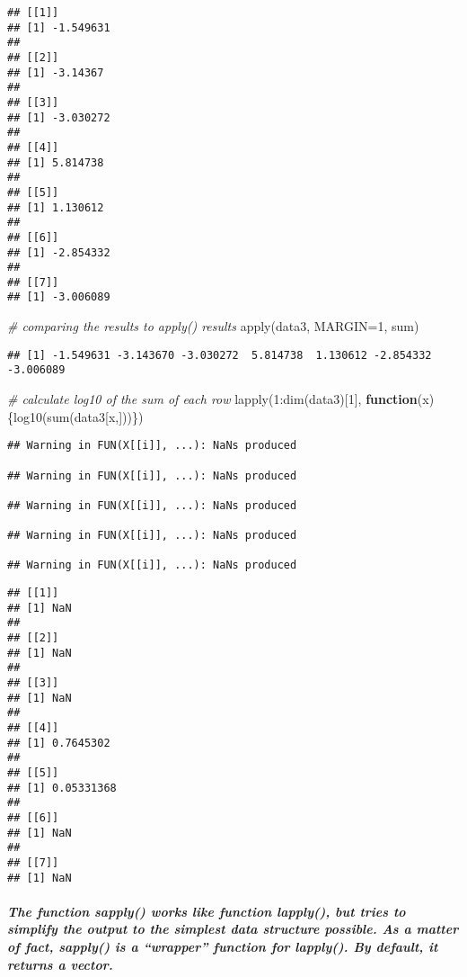 \documentclass[
]{article}
\newenvironment{Shaded}{\begin{snugshade}}{\end{snugshade}}
\newcommand{\AttributeTok}[1]{\textcolor[rgb]{0.77,0.63,0.00}{#1}}
\newcommand{\CommentTok}[1]{\textcolor[rgb]{0.56,0.35,0.01}{\textit{#1}}}
\newcommand{\ControlFlowTok}[1]{\textcolor[rgb]{0.13,0.29,0.53}{\textbf{#1}}}
\newcommand{\DecValTok}[1]{\textcolor[rgb]{0.00,0.00,0.81}{#1}}
\newcommand{\FunctionTok}[1]{\textcolor[rgb]{0.00,0.00,0.00}{#1}}
\newcommand{\NormalTok}[1]{#1}
\newcommand{\SpecialCharTok}[1]{\textcolor[rgb]{0.00,0.00,0.00}{#1}}
\begin{document}
\begin{verbatim}
## [[1]]
## [1] -1.549631
## 
## [[2]]
## [1] -3.14367
## 
## [[3]]
## [1] -3.030272
## 
## [[4]]
## [1] 5.814738
## 
## [[5]]
## [1] 1.130612
## 
## [[6]]
## [1] -2.854332
## 
## [[7]]
## [1] -3.006089
\end{verbatim}

\begin{Shaded}
\begin{Highlighting}[]
\CommentTok{\# comparing the results to apply() results}
\FunctionTok{apply}\NormalTok{(data3, }\AttributeTok{MARGIN=}\DecValTok{1}\NormalTok{, sum)}
\end{Highlighting}
\end{Shaded}

\begin{verbatim}
## [1] -1.549631 -3.143670 -3.030272  5.814738  1.130612 -2.854332 -3.006089
\end{verbatim}

\begin{Shaded}
\begin{Highlighting}[]
\CommentTok{\# calculate log10 of the sum of each row}
\FunctionTok{lapply}\NormalTok{(}\DecValTok{1}\SpecialCharTok{:}\FunctionTok{dim}\NormalTok{(data3)[}\DecValTok{1}\NormalTok{], }\ControlFlowTok{function}\NormalTok{(x)\{}\FunctionTok{log10}\NormalTok{(}\FunctionTok{sum}\NormalTok{(data3[x,]))\})}
\end{Highlighting}
\end{Shaded}

\begin{verbatim}
## Warning in FUN(X[[i]], ...): NaNs produced

## Warning in FUN(X[[i]], ...): NaNs produced

## Warning in FUN(X[[i]], ...): NaNs produced

## Warning in FUN(X[[i]], ...): NaNs produced

## Warning in FUN(X[[i]], ...): NaNs produced
\end{verbatim}

\begin{verbatim}
## [[1]]
## [1] NaN
## 
## [[2]]
## [1] NaN
## 
## [[3]]
## [1] NaN
## 
## [[4]]
## [1] 0.7645302
## 
## [[5]]
## [1] 0.05331368
## 
## [[6]]
## [1] NaN
## 
## [[7]]
## [1] NaN
\end{verbatim}

\hypertarget{the-function-sapply-works-like-function-lapply-but-tries-to-simplify-the-output-to-the-simplest-data-structure-possible.-as-a-matter-of-fact-sapply-is-a-wrapper-function-for-lapply.-by-default-it-returns-a-vector.}{%
\subparagraph{The function sapply() works like function lapply(), but
tries to simplify the output to the simplest data structure possible. As
a matter of fact, sapply() is a ``wrapper'' function for lapply(). By
default, it returns a
vector.}\label{the-function-sapply-works-like-function-lapply-but-tries-to-simplify-the-output-to-the-simplest-data-structure-possible.-as-a-matter-of-fact-sapply-is-a-wrapper-function-for-lapply.-by-default-it-returns-a-vector.}}
\end{document}
